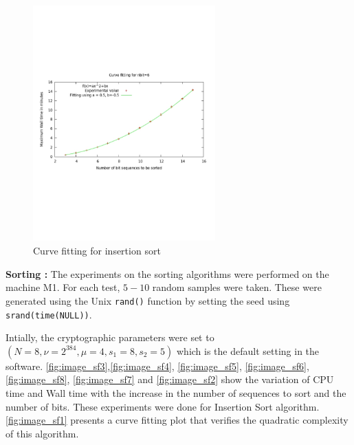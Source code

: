 \documentclass{acm_proc_article-sp}
\begin{document}
\begin{figure}[!H]%
\centering
\includegraphics[width=7cm]{fsort1.pdf} 
\caption{Curve fitting for insertion sort}
\label{fig:image_sf1} %
\end{figure}

 \textbf{Sorting :} 
The experiments on the sorting algorithms were performed on the machine M1. For each test, $5-10$ random samples were taken. These were generated using the Unix \texttt{rand()} function by setting the seed using \texttt{srand(time(NULL))}. 

Intially, the cryptographic parameters were set to $(N = 8, \nu = 2^{384}, \mu = 4, s_1 = 8, s_2 = 5)$ which is the default setting in the software. \autoref{fig:image_sf3},\autoref{fig:image_sf4}, \autoref{fig:image_sf5}, \autoref{fig:image_sf6}, \\ \autoref{fig:image_sf8}, \autoref{fig:image_sf7} and \autoref{fig:image_sf2} show the variation of CPU time and Wall time with the increase in the number of sequences to sort and the number of bits. These experiments were done for Insertion Sort algorithm. \autoref{fig:image_sf1} presents a  curve fitting plot that verifies the quadratic complexity of this algorithm.

\begin{table}
\caption{Wall time for Bitonic Sort}
\end{table}
\end{document}
